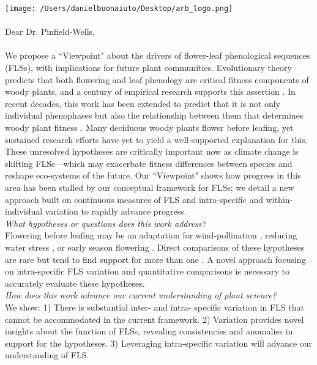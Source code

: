 \documentclass[11pt,a4paper]{article}
\begin{document}

\def\labelitemi{--}
\parindent=24pt
\texttt{[image: /Users/danielbuonaiuto/Desktop/arb\_logo.png]}
\\\\
{Dear Dr. Pinfield-Wells,}\\
\vspace{1.5ex}\\
\noindent We propose a ``Viewpoint" about the drivers of flower-leaf phenological sequences (FLSs), with implications for future plant communities. Evolutionary theory predicts that both flowering and leaf phenology are critical fitness components of woody plants, and a century of empirical research supports this assertion \citep{Munguia-Rosas2011,Forrest2010}. In recent decades, this work has been extended to predict that it is not only individual phenophases but also the relationship between them that determines woody plant fitness \citep{Menzel1999,Ettinger2018}. Many deciduous woody plants flower before leafing, yet sustained research efforts have yet to yield a well-supported explanation for this. These unresolved hypotheses are critically important now as climate change is shifting FLSs---which may exacerbate fitness differences between species and reshape eco-systems of the future. Our ``Viewpoint" shows how progress in this area has been stalled by our conceptual framework for FLSs; we detail a new approach built on continuous measures of FLS and intra-specific and within-individual variation to rapidly advance progress.\\

\noindent \emph{What hypotheses or questions does this work address?}\\

\noindent Flowering before leafing may be an adaptation for wind-pollination \citep{Rathcke_1985}, reducing water stress \citep{Reich1984}, or early season flowering \citep{Primack1987}. Direct comparisons of these hypotheses are rare but tend to find support for more than one \citep{Gougherty2018,Bolmgren2003}. A novel approach focusing on intra-specific FLS variation and quantitative comparisons is necessary to accurately evaluate these hypotheses.\\

\noindent \emph{How does this work advance our current understanding of plant science?}\\

\noindent We show: 1) There is substantial inter- and intra- specific variation in FLS that cannot be accommodated in the current framework. 2) Variation provides novel insights about the function of FLSs, revealing consistencies and anomalies in support for the hypotheses. 3) Leveraging intra-specific variation will advance our understanding of FLS.\\
\end{document}
